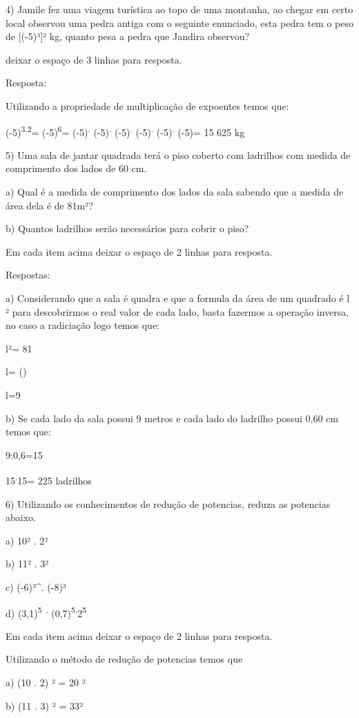 4) Jamile fez uma viagem turística ao topo de uma montanha, ao chegar em
certo local observou uma pedra antiga com o seguinte enunciado, esta
pedra tem o peso de {[}(-5)³{]}² kg, quanto pesa a pedra que Jandira
observou?

deixar o espaço de 3 linhas para resposta.

Resposta:

Utilizando a propriedade de multiplicação de expoentes temos que:

(-5)\textsuperscript{3.2}= (-5)\textsuperscript{6}=
(-5)\textsuperscript{.} (-5)\textsuperscript{.} (-5)\textsuperscript{.}
(-5)\textsuperscript{.} (-5)\textsuperscript{.} (-5)= 15 625 kg

5) Uma sala de jantar quadrada terá o piso coberto com ladrilhos com
medida de comprimento dos lados de 60 cm.

a) Qual é a medida de comprimento dos lados da sala sabendo que a medida
de área dela é de 81m²?

b) Quantos ladrilhos serão necessários para cobrir o piso?

Em cada item acima deixar o espaço de 2 linhas para resposta.

Respostas:

a) Considerando que a sala é quadra e que a formula da área de um
quadrado é l ² para descobrirmos o real valor de cada lado, basta
fazermos a operação inversa, no caso a radiciação logo temos que:

l²= 81

l= ()

l=9

b) Se cada lado da sala possui 9 metros e cada lado do ladrilho possui
0,60 cm temos que:

9:0,6=15

15\textsuperscript{.}15= 225 ladrilhos

6) Utilizando os conhecimentos de redução de potencias, reduza as
potencias abaixo.

a) 10² . 2²

b) 11² . 3²

c) (-6)³^{.} (-8)³

d) (3,1)\textsuperscript{5~.}
(0,7)\textsuperscript{5.}2\textsuperscript{5}

Em cada item acima deixar o espaço de 2 linhas para resposta.

Utilizando o método de redução de potencias temos que

a) (10 . 2) ² = 20 ²

b) (11 . 3) ² = 33²

